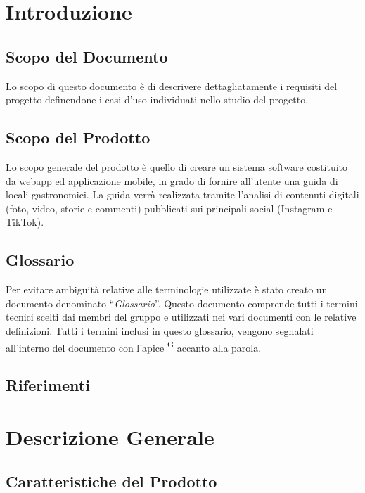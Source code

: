 \documentclass[letterpaper]{article}
\begin{document}
\pagebreak

\renewcommand{\contentsname}{Indice}
\tableofcontents
\pagebreak

\section{Introduzione}

\subsection{Scopo del Documento}
Lo scopo di questo documento è di descrivere dettagliatamente i requisiti del progetto definendone i casi d’uso individuati nello studio del progetto.

\subsection{Scopo del Prodotto}

Lo scopo generale del prodotto è quello di creare un sistema software costituito da webapp ed applicazione mobile, in grado di fornire all’utente una guida di locali gastronomici. La guida verrà realizzata tramite l’analisi di contenuti digitali (foto, video, storie e commenti) pubblicati sui principali social (Instagram e TikTok). 

\subsection{Glossario}

Per evitare ambiguità relative alle terminologie utilizzate è stato creato un documento denominato “\textit{Glossario}”. Questo documento comprende tutti i termini tecnici scelti dai membri del gruppo e utilizzati nei vari documenti con le relative definizioni. Tutti i termini inclusi in questo glossario, vengono segnalati all’interno del documento con l’apice \textsuperscript{G} accanto alla parola.

\subsection{Riferimenti}

\section{Descrizione Generale}

\subsection{Caratteristiche del Prodotto}
\end{document}
